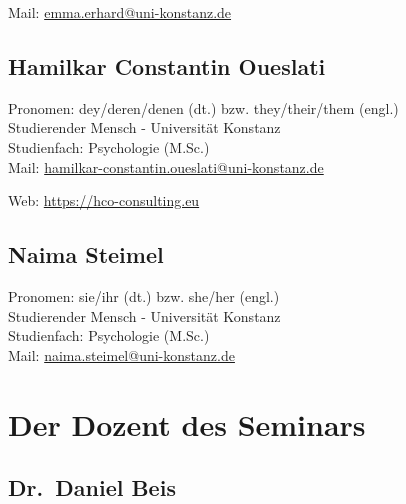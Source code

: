 \documentclass[
  a4paper,
]{report}
\begin{document}
Mail: \href{mailto:emma.erhard@uni-konstanz.de?subject=Freier\%20Wille\%20als\%20Illusion\%20oder\%20Notwendigkeit}{emma.erhard@uni-konstanz.de}

\hypertarget{hamilkar-constantin-oueslati}{%
\subsection*{Hamilkar Constantin Oueslati}\label{hamilkar-constantin-oueslati}}

Pronomen: dey/deren/denen (dt.) bzw. they/their/them (engl.)\\
Studierender Mensch - Universität Konstanz\\
Studienfach: Psychologie (M.Sc.)\\

Mail: \href{mailto:hamilkar-constantin.oueslati@uni-konstanz.de?subject=Freier\%20Wille\%20als\%20Illusion\%20oder\%20Notwendigkeit}{hamilkar-constantin.oueslati@uni-konstanz.de}

Web: \url{https://hco-consulting.eu}

\hypertarget{naima-steimel}{%
\subsection*{Naima Steimel}\label{naima-steimel}}

Pronomen: sie/ihr (dt.) bzw. she/her (engl.)\\
Studierender Mensch - Universität Konstanz\\
Studienfach: Psychologie (M.Sc.)\\

Mail: \href{mailto:naima.steimel@uni-konstanz.de?subject=Freier\%20Wille\%20als\%20Illusion\%20oder\%20Notwendigkeit}{naima.steimel@uni-konstanz.de}

\hypertarget{der-dozent-des-seminars}{%
\section*{Der Dozent des Seminars}\label{der-dozent-des-seminars}}

\hypertarget{dr.-daniel-beis}{%
\subsection*{Dr.~Daniel Beis}\label{dr.-daniel-beis}}
\end{document}
